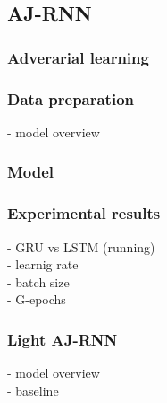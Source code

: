 \subsection{AJ-RNN}

\subsubsection{Adverarial learning}

\subsubsection{Data preparation}
- model overview

\subsubsection{Model}

\subsubsection{Experimental results}
- GRU vs LSTM (running)\\
- learnig rate\\
- batch size \\
- G-epochs

\subsubsection{Light AJ-RNN}
- model overview\\
- baseline